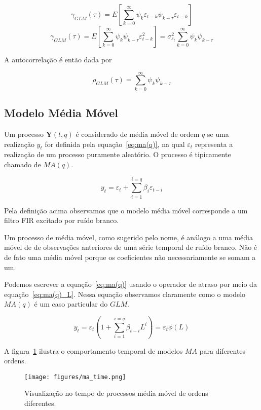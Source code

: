 $$\gamma_{GLM}(\tau) = E\left[\sum^{\infty}_{k=0} \psi_{k} \varepsilon_{t-k} \psi_{k-\tau} \varepsilon_{t-k}\right] $$
$$\gamma_{GLM}(\tau) = E\left[\sum^{\infty}_{k=0} \psi_{k}\psi_{k-\tau} \varepsilon_{t-k}^2\right] = \sigma^2_{\varepsilon_t}\sum^{\infty}_{k=0}\psi_{k}\psi_{k-\tau} $$

A autocorrelação é então dada por

$$ \rho_{GLM}(\tau) = \sum^{\infty}_{k=0}\psi_{k}\psi_{k-\tau} $$

\subsection{Modelo Média Móvel}

Um processo ${\mathbf{Y}(t, q)}$ é considerado de média móvel de ordem $q$ se uma
realização $y_t$ for definida pela equação~\ref{eq:ma(q)}, na qual
$\varepsilon_t$ representa a realização de um processo puramente aleatório. O
processo é tipicamente chamado de $MA(q)$.

\begin{equation}\label{eq:ma(q)}
    y_t = \varepsilon_t + \sum_{i=1}^{i=q} \beta_i \varepsilon_{t-i}
\end{equation}

Pela definição acima observamos que o modelo média móvel corresponde a um
filtro FIR excitado por ruído branco.

Um processo de média móvel, como sugerido pelo nome, é análogo a uma média
móvel de de observações anteriores de uma série temporal de ruído branco. Não
é de fato uma média móvel porque os coeficientes não necessariamente se somam a
um.

Podemos escrever a equação~\ref{eq:ma(q)} usando o operador de atraso por meio
da equação~\ref{eq:ma(q)_L}. Nessa equação observamos claramente como o modelo
$MA(q)$ é um caso particular do $GLM$.

\begin{equation}\label{eq:ma(q)_L}
    y_t = \varepsilon_t(1 + \sum_{i=1}^{i=q} \beta_{t-i} L^{i}) = \varepsilon_t \phi(L)
\end{equation}

A figura~\ref{fig:ma_time} ilustra o comportamento temporal de modelos $MA$ para
diferentes ordens.

\begin{figure}[H]
    \centering
    \texttt{[image: figures/ma\_time.png]}
    \caption{Visualização no tempo de processos média móvel de ordens
    diferentes.}
    \label{fig:ma_time}
\end{figure}

